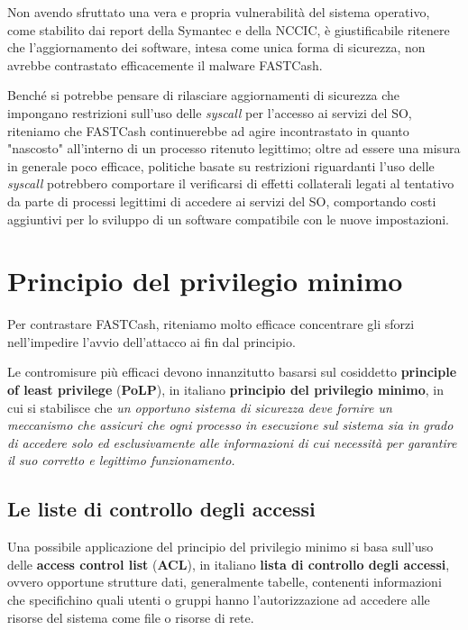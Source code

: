\documentclass[10pt,a4paper, titlepage]{report}
\begin{document}
Non avendo sfruttato una vera e propria vulnerabilità del sistema operativo, come stabilito dai report della Symantec e della NCCIC, è giustificabile ritenere che l'aggiornamento dei software, intesa come unica forma di sicurezza, non avrebbe contrastato efficacemente il malware FASTCash. 

Benché si potrebbe pensare di rilasciare aggiornamenti di sicurezza che impongano restrizioni sull'uso delle \textit{syscall} per l'accesso ai servizi del SO, riteniamo che FASTCash continuerebbe ad agire incontrastato in quanto "nascosto" all'interno di un processo ritenuto legittimo; oltre ad essere una misura in generale poco efficace, politiche basate su restrizioni riguardanti l'uso delle \textit{syscall} potrebbero comportare il verificarsi di effetti collaterali legati al tentativo da parte di processi legittimi di accedere ai servizi del SO, comportando costi aggiuntivi per lo sviluppo di un software compatibile con le nuove impostazioni. 

\section{Principio del privilegio minimo}

Per contrastare FASTCash, riteniamo molto efficace concentrare gli sforzi nell'impedire l'avvio dell'attacco ai fin dal principio. 

Le contromisure più efficaci devono innanzitutto basarsi sul cosiddetto \textbf{principle of least privilege} (\textbf{PoLP}), in italiano \textbf{principio del privilegio minimo}, in cui si stabilisce che \textit{un opportuno sistema di sicurezza deve fornire un meccanismo che assicuri che ogni processo in esecuzione sul sistema sia in grado di accedere solo ed esclusivamente alle informazioni di cui necessità per garantire il suo corretto e legittimo funzionamento.}

\subsection{Le liste di controllo degli accessi}

Una possibile applicazione del principio del privilegio minimo si basa sull'uso delle \textbf{access control list} (\textbf{ACL}), in italiano \textbf{lista di controllo degli accessi}, ovvero opportune strutture dati, generalmente tabelle, contenenti informazioni che specifichino quali utenti o gruppi hanno l'autorizzazione ad accedere alle risorse del sistema come file o risorse di rete.
\end{document}
